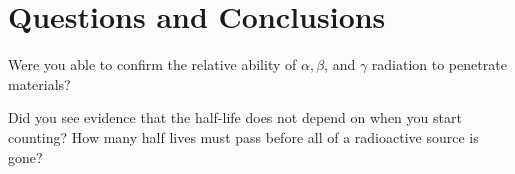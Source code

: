 \section {Questions and Conclusions}
Were you able to confirm the relative ability of $\alpha, \beta$, and $\gamma$ radiation to penetrate materials?

Did you see evidence that the half-life does not depend on when you start counting? How many half lives must pass before all of a radioactive source is gone? 
 
\endinput
